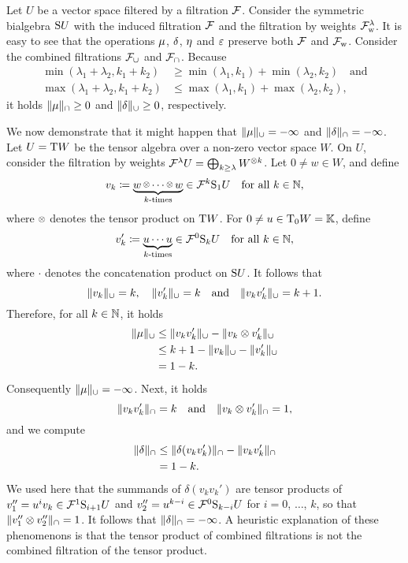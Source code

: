 \documentclass[\MainFolder/Text.tex]{subfiles}
\begin{document}
\begin{Example}\label{Ex:CombinedOnSymetric}
Let $U$ be a vector space filtered by a filtration $\mathcal{F}$. Consider the symmetric bialgebra $\mathrm{S} U$ with the induced filtration $\mathcal{F}$ and the filtration by weights $\mathcal{F}_{\mathrm{w}}^\lambda$. It is easy to see that the operations $\mu$, $\delta$, $\eta$ and $\varepsilon$ preserve both $\mathcal{F}$ and $\mathcal{F}_{\mathrm{w}}$. Consider the combined filtrations $\mathcal{F}_\cup$ and $\mathcal{F}_\cap$. Because
\begin{align*}
\min(\lambda_1 + \lambda_2,k_1+k_2) &\ge \min(\lambda_1,k_1) + \min(\lambda_2,k_2)\quad\text{and}\\
\max(\lambda_1 + \lambda_2,k_1+k_2) &\le \max(\lambda_1,k_1) + \max(\lambda_2,k_2),
\end{align*}
it holds $\| \mu \|_\cap \ge 0$ and $\| \delta \|_\cup\ge 0$, respectively.

We now demonstrate that it might happen that $\| \mu \|_\cup = - \infty$ and $\| \delta \|_\cap = -\infty$. Let $U = \mathrm{T} W$ be the tensor algebra over a non-zero vector space $W$. On $U$, consider the filtration by weights $\mathcal{F}^\lambda U = \bigoplus_{k\ge \lambda} W^{\otimes k}$. Let $0\neq w\in W$, and define 
\[ v_k \coloneqq \underbrace{w\smallotimes \dotsb \smallotimes w}_{k\text{-times}} \in \Filtr^{k} \Sym_1 U\quad\text{for all }k\in\N, \]
where $\smallotimes$ denotes the tensor product on $\mathrm{T} W$. For $0\neq u \in \mathrm{T}_0 W = \mathbb{K}$, define 
\[ v_k' \coloneqq \underbrace{u\dotsb u}_{k\text{-times}} \in \mathcal{F}^0 \mathrm{S}_k U\quad\text{for all }k\in \mathbb{N}, \]
where $\cdot$ denotes the concatenation product on $\mathrm{S} U$. It follows that 
\[ \| v_k \|_{\cup} = k,\quad\| v_k' \|_{\cup} = k\quad\text{and}\quad\| v_k v_k' \|_\cup = k+1. \]
Therefore, for all $k\in \mathbb{N}$, it holds
\begin{align*}
\| \mu \|_\cup &\le \| v_k v_k' \|_\cup - \| v_k \otimes v_k' \|_{\cup} \\
&\le k + 1 - \| v_k \|_\cup - \| v_k' \|_\cup \\
&=  1 - k.
\end{align*}
Consequently $\| \mu \|_\cup = -\infty$. Next, it holds 
\[ \| v_k v_k' \|_\cap = k\quad\text{and}\quad\| v_k\otimes v_k' \|_\cap = 1, \]
and we compute
\begin{align*}
\| \delta \|_\cap &\le \| \delta(v_k v_k') \|_\cap - \| v_k v_k' \|_\cap \\ 
&=  1 - k.
\end{align*}
We used here that the summands of $\delta(v_k v_k')$ are tensor products of $v_1''=u^{i} v_k \in \mathcal{F}^1 \mathrm{S}_{i+1} U$ and $v_2''=u^{k-i} \in \mathcal{F}^0 \mathrm{S}_{k-i} U$ for $i=0$, $\dotsc$, $k$, so that $\| v_1'' \otimes v_2'' \|_\cap = 1$. It follows that $\| \delta \|_\cap = -\infty$. A heuristic explanation of these phenomenons is that the tensor product of combined filtrations is not the combined filtration of the tensor product.


\end{Example}
\end{document}
